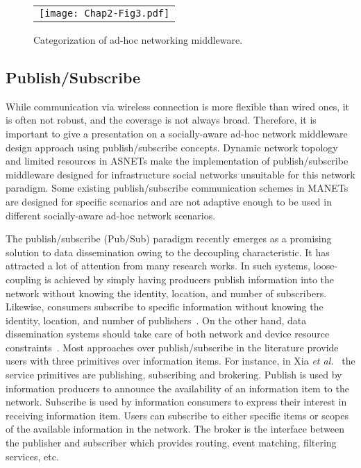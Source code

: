 \begin{figure}[t]
\begin{center}
  \begin{tabular}{c}
  \texttt{[image: Chap2-Fig3.pdf]}
  \end{tabular}
  \caption{Categorization of ad-hoc networking middleware.}
\end{center}
\end{figure}

\subsection{Publish/Subscribe}\label{Chap2_03_01}
While communication via wireless connection is more flexible than wired ones, it is often not robust, and the coverage is not always broad. Therefore, it is important to give a presentation on a socially-aware ad-hoc network middleware design approach using publish/subscribe concepts. Dynamic network topology and limited resources in ASNETs make the implementation of publish/subscribe middleware designed for infrastructure social networks unsuitable for this network paradigm. Some existing publish/subscribe communication schemes in MANETs are designed for specific scenarios and are not adaptive enough to be used in different socially-aware ad-hoc network scenarios.

The publish/subscribe (Pub/Sub) paradigm recently emerges as a promising solution to data dissemination owing to the decoupling characteristic. It has attracted a lot of attention from many research works. In such systems, loose-coupling is achieved by simply having producers publish information into the network without knowing the identity, location, and number of subscribers. Likewise, consumers subscribe to specific information without knowing the identity, location, and number of publishers~\cite{AKYCheung2010}\cite{EYoneki2007}. On the other hand, data dissemination systems should take care of both network and device resource constraints~\cite{CBoldrini2008}. Most approaches over publish/subscribe in the literature provide users with three primitives over information items. For instance, in Xia {\it et al.}~\cite{FXia2013} the service primitives are publishing, subscribing and brokering. Publish is used by information producers to announce the availability of an information item to the network. Subscribe is used by information consumers to express their interest in receiving information item. Users can subscribe to either specific items or scopes of the available information in the network. The broker is the interface between the publisher and subscriber which provides routing, event matching, filtering services, etc.

